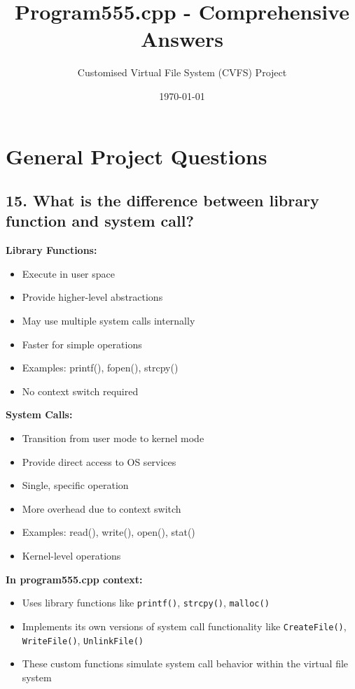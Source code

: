 \documentclass[11pt,a4paper]{article}
\title{\textbf{Program555.cpp - Comprehensive Answers}}
\author{Customised Virtual File System (CVFS) Project}
\date{\today}
\begin{document}
\maketitle
\tableofcontents
\newpage

\section{General Project Questions}

\subsection{15. What is the difference between library function and system call?}

\textbf{Library Functions:}
\begin{itemize}
    \item Execute in user space
    \item Provide higher-level abstractions
    \item May use multiple system calls internally
    \item Faster for simple operations
    \item Examples: printf(), fopen(), strcpy()
    \item No context switch required
\end{itemize}

\textbf{System Calls:}
\begin{itemize}
    \item Transition from user mode to kernel mode
    \item Provide direct access to OS services
    \item Single, specific operation
    \item More overhead due to context switch
    \item Examples: read(), write(), open(), stat()
    \item Kernel-level operations
\end{itemize}

\textbf{In program555.cpp context:}
\begin{itemize}
    \item Uses library functions like \texttt{printf()}, \texttt{strcpy()}, \texttt{malloc()}
    \item Implements its own versions of system call functionality like \texttt{CreateFile()}, \texttt{WriteFile()}, \texttt{UnlinkFile()}
    \item These custom functions simulate system call behavior within the virtual file system
\end{itemize}
\end{document}
